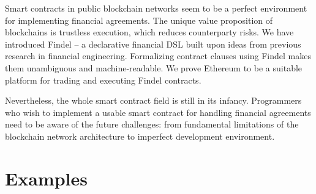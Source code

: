 Smart contracts in public blockchain networks seem to be a perfect environment for implementing financial agreements.
The unique value proposition of blockchains is trustless execution, which reduces counterparty risks.
We have introduced Findel -- a declarative financial DSL built upon ideas from previous research in financial engineering.
Formalizing contract clauses using Findel makes them unambiguous and machine-readable.
We prove Ethereum to be a suitable platform for trading and executing Findel contracts.

Nevertheless, the whole smart contract field is still in its infancy.
Programmers who wish to implement a usable smart contract for handling financial agreements need to be aware of the future challenges: from fundamental limitations of the blockchain network architecture to imperfect development environment.

\pagebreak

\section{Examples} \label{sec:Ch10FindelExamples}

